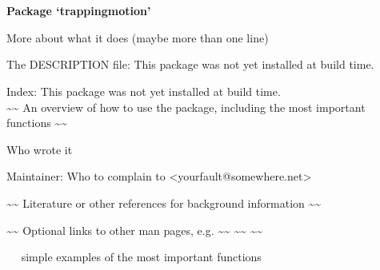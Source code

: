 \documentclass[a4paper]{book}
\begin{document}
\chapter*{}
\begin{center}
{\textbf{\huge Package `trappingmotion'}}
\par\bigskip{\large \today}
\end{center}
\begin{description}
\raggedright{}
\item[Type]
\item[Title]
\item[Version]
\item[Date]
\item[Author]
\item[Maintainer]\AsIs{}
\item[Description]
\item[License]
\item[RoxygenNote]
\end{description}
%
\begin{Description}\relax
More about what it does (maybe more than one line)
\end{Description}
%
\begin{Details}\relax

The DESCRIPTION file:
This package was not yet installed at build time.\\{}

Index:  This package was not yet installed at build time.\\{}
\textasciitilde{}\textasciitilde{} An overview of how to use the package, including the most important functions \textasciitilde{}\textasciitilde{}
\end{Details}
%
\begin{Author}\relax
Who wrote it

Maintainer: Who to complain to <yourfault@somewhere.net>
\end{Author}
%
\begin{References}\relax
\textasciitilde{}\textasciitilde{} Literature or other references for background information \textasciitilde{}\textasciitilde{}
\end{References}
%
\begin{SeeAlso}\relax
\textasciitilde{}\textasciitilde{} Optional links to other man pages, e.g. \textasciitilde{}\textasciitilde{}
\textasciitilde{}\textasciitilde{}  \textasciitilde{}\textasciitilde{}
\end{SeeAlso}
%
\begin{Examples}
\begin{ExampleCode}
~~ simple examples of the most important functions ~~
\end{ExampleCode}
\end{Examples}
\printindex{}
\end{document}
